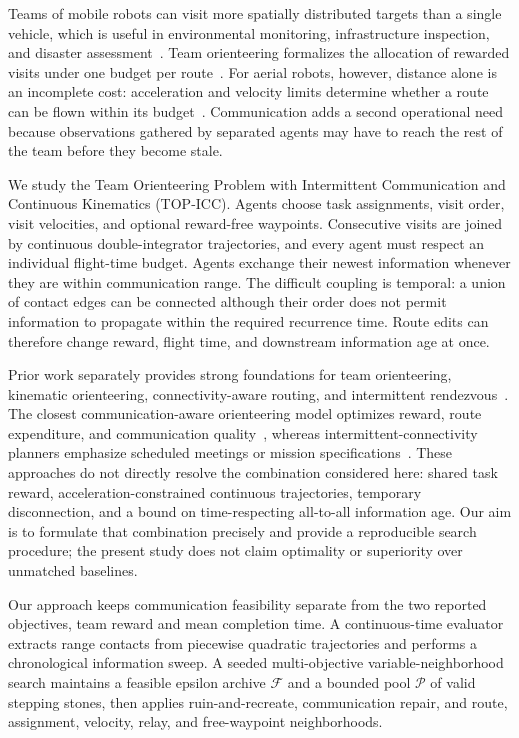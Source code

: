 Teams of mobile robots can visit more spatially distributed targets than a single vehicle, which is useful in environmental monitoring, infrastructure inspection, and disaster assessment~\cite{mansfield2021multirobot}. Team orienteering formalizes the allocation of rewarded visits under one budget per route~\cite{chao1996team}. For aerial robots, however, distance alone is an incomplete cost: acceleration and velocity limits determine whether a route can be flown within its budget~\cite{meyer2022kop}. Communication adds a second operational need because observations gathered by separated agents may have to reach the rest of the team before they become stale.

We study the Team Orienteering Problem with Intermittent Communication and Continuous Kinematics (TOP-ICC). Agents choose task assignments, visit order, visit velocities, and optional reward-free waypoints. Consecutive visits are joined by continuous double-integrator trajectories, and every agent must respect an individual flight-time budget. Agents exchange their newest information whenever they are within communication range. The difficult coupling is temporal: a union of contact edges can be connected although their order does not permit information to propagate within the required recurrence time. Route edits can therefore change reward, flight time, and downstream information age at once.

Prior work separately provides strong foundations for team orienteering, kinematic orienteering, connectivity-aware routing, and intermittent rendezvous~\cite{gunawan2016survey,meyer2022kop,topcc,kantaros2017temporal,silva2023rendezvous}. The closest communication-aware orienteering model optimizes reward, route expenditure, and communication quality~\cite{topcc}, whereas intermittent-connectivity planners emphasize scheduled meetings or mission specifications~\cite{kantaros2016intermittent,kantaros2017temporal}. These approaches do not directly resolve the combination considered here: shared task reward, acceleration-constrained continuous trajectories, temporary disconnection, and a bound on time-respecting all-to-all information age. Our aim is to formulate that combination precisely and provide a reproducible search procedure; the present study does not claim optimality or superiority over unmatched baselines.

Our approach keeps communication feasibility separate from the two reported objectives, team reward and mean completion time. A continuous-time evaluator extracts range contacts from piecewise quadratic trajectories and performs a chronological information sweep. A seeded multi-objective variable-neighborhood search maintains a feasible epsilon archive $\mathcal F$ and a bounded pool $\mathcal P$ of valid stepping stones, then applies ruin-and-recreate, communication repair, and route, assignment, velocity, relay, and free-waypoint neighborhoods.

